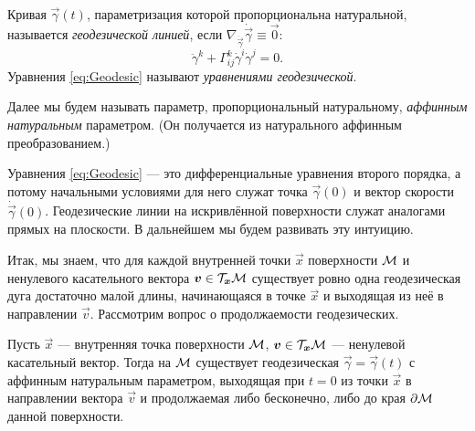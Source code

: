 \begin{definition}
	Кривая $\vec{\gamma}(t)$, параметризация которой пропорциональна натуральной, называется \textit{геодезической линией}, если $\nabla_{\dot{\vec{\gamma}}}\dot{\vec{\gamma}} \equiv \vec{0}$:
	\begin{equation} \label{eq:Geodesic}
		\ddot{\gamma}^k + \Gamma_{ij}^k\dot{\gamma}^i\dot\gamma^j = 0.
	\end{equation}
	Уравнения \eqref{eq:Geodesic} называют \textit{уравнениями геодезической}.
\end{definition}

Далее мы будем называть параметр, пропорциональный натуральному, \textit{аффинным натуральным} параметром. (Он получается из натурального аффинным преобразованием.)

Уравнения \eqref{eq:Geodesic} --- это дифференциальные уравнения второго порядка, а потому начальными условиями для него служат точка $\vec{\gamma}(0)$ и вектор скорости $\dot{\vec{\gamma}}(0)$. Геодезические линии на искривлённой поверхности служат аналогами прямых на плоскости. В дальнейшем мы будем развивать эту интуицию.

Итак, мы знаем, что для каждой внутренней точки $\vec{x}$ поверхности $\mathcal{M}$ и ненулевого касательного вектора $\boldsymbol{v} \in \mathcal{T}_{\boldsymbol{x}}\mathcal{M}$ существует ровно одна геодезическая дуга достаточно малой длины, начинающаяся в точке $\vec{x}$ и выходящая из неё в направлении $\vec{v}$. Рассмотрим вопрос о продолжаемости геодезических.

\begin{theorem}
	Пусть $\vec{x}$ --- внутренняя точка поверхности $\mathcal{M}$, $\boldsymbol{v} \in \mathcal{T}_{\boldsymbol{x}}\mathcal{M}$ --- ненулевой касательный вектор. Тогда на $\mathcal{M}$ существует геодезическая $\vec{\gamma} = \vec{\gamma}(t)$ с аффинным натуральным параметром, выходящая при $t = 0$ из точки $\vec{x}$ в направлении вектора $\vec{v}$ и продолжаемая либо бесконечно, либо до края $\partial\mathcal{M}$ данной поверхности.
\end{theorem}


